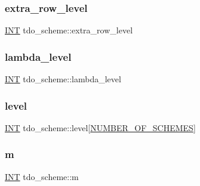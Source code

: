 \mbox{\label{classtdo__scheme_a416dfb24e31be5c2686f141c8c591531}} 
\subsubsection{\texorpdfstring{extra\+\_\+row\+\_\+level}{extra\_row\_level}}
{\footnotesize\ttfamily \mbox{\hyperlink{galois_8h_a09fddde158a3a20bd2dcadb609de11dc}{I\+NT}} tdo\+\_\+scheme\+::extra\+\_\+row\+\_\+level}

\mbox{\label{classtdo__scheme_aa4029ca357371d64c3715f9d40c0b752}} 
\subsubsection{\texorpdfstring{lambda\+\_\+level}{lambda\_level}}
{\footnotesize\ttfamily \mbox{\hyperlink{galois_8h_a09fddde158a3a20bd2dcadb609de11dc}{I\+NT}} tdo\+\_\+scheme\+::lambda\+\_\+level}

\mbox{\label{classtdo__scheme_a956608d0f5bee0b741523bc268ebe831}} 
\subsubsection{\texorpdfstring{level}{level}}
{\footnotesize\ttfamily \mbox{\hyperlink{galois_8h_a09fddde158a3a20bd2dcadb609de11dc}{I\+NT}} tdo\+\_\+scheme\+::level\mbox{[}\mbox{\hyperlink{incidence_8h_a27f25725c4772efe473058135daeba55}{N\+U\+M\+B\+E\+R\+\_\+\+O\+F\+\_\+\+S\+C\+H\+E\+M\+ES}}\mbox{]}}

\mbox{\label{classtdo__scheme_a9af99d7f94c680a8067906ba9992eca5}} 
\subsubsection{\texorpdfstring{m}{m}}
{\footnotesize\ttfamily \mbox{\hyperlink{galois_8h_a09fddde158a3a20bd2dcadb609de11dc}{I\+NT}} tdo\+\_\+scheme\+::m}

